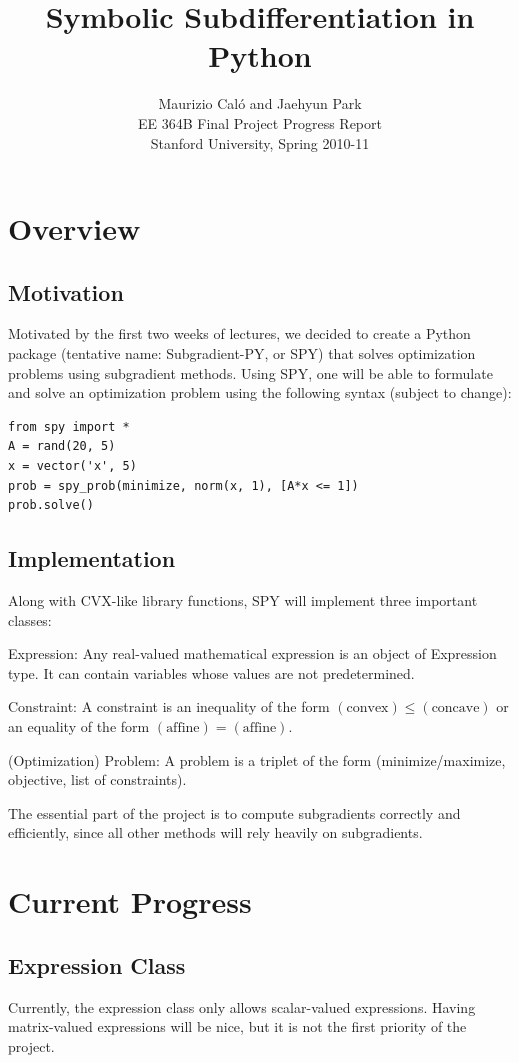 \documentclass[12pt]{article}
\title{Symbolic Subdifferentiation in Python}
\author{Maurizio Cal\'o and Jaehyun Park\\
EE 364B Final Project Progress Report\\
Stanford University, Spring 2010-11}
\begin{document}
\maketitle

\section{Overview}
\subsection{Motivation}
Motivated by the first two weeks of lectures, we decided to create a
Python package (tentative name: Subgradient-PY, or SPY) that solves
optimization problems using subgradient methods. Using SPY, one will
be able to formulate and solve an optimization problem using the
following syntax (subject to change):
\begin{verbatim}
from spy import *
A = rand(20, 5)
x = vector('x', 5)
prob = spy_prob(minimize, norm(x, 1), [A*x <= 1])
prob.solve()
\end{verbatim}

\subsection{Implementation}
Along with CVX-like library functions, SPY will implement three
important classes:
\BIT
\item Expression: Any real-valued mathematical expression is an object
of Expression type. It can contain variables whose values are not
predetermined.
\item Constraint: A constraint is an inequality of the form
$(\mbox{convex}) \le (\mbox{concave})$ or an equality of the form
$(\mbox{affine}) = (\mbox{affine})$.
\item (Optimization) Problem: A problem is a triplet of the form (minimize/maximize, objective, list of constraints).
\EIT

The essential part of the project is to compute subgradients correctly
and efficiently, since all other methods will rely heavily on subgradients.

\section{Current Progress}
\subsection{Expression Class}
Currently, the expression class only allows scalar-valued expressions. Having matrix-valued expressions will be nice, but it is not the first priority of the project.
\end{document}

